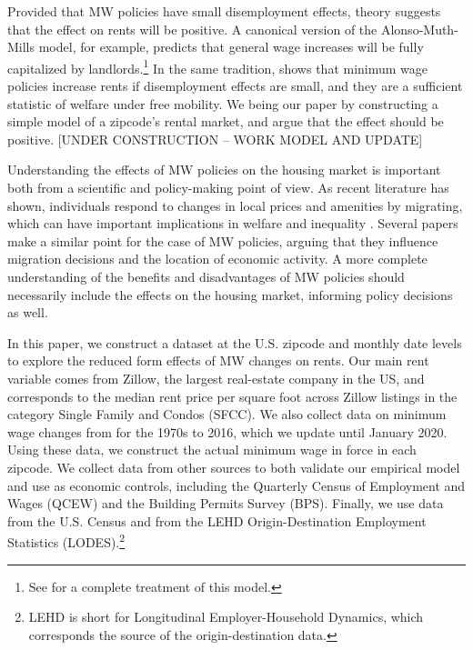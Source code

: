 Provided that MW policies have small disemployment effects, theory suggests that the effect 
on rents will be positive. A canonical version of the Alonso-Muth-Mills model, for example, 
predicts that general wage increases will be fully capitalized by landlords.\footnote{See 
	\textcite{Brueckner1987} for a complete treatment of this model.} 
In the same tradition, \textcite{Yamagishi2020} shows that minimum wage policies increase 
rents if disemployment effects are small, and they are a sufficient statistic of welfare 
under free mobility. We being our paper by constructing a simple model of a zipcode's rental 
market, and argue that the effect should be positive. [UNDER CONSTRUCTION -- WORK MODEL AND 
UPDATE]
 
Understanding the effects of MW policies on the housing market is important both from a 
scientific and policy-making point of view. As recent literature has shown, individuals 
respond to changes in local prices and amenities by migrating, which can have important 
implications in welfare and inequality \parencite{Diamond2016, Couture2019}. Several papers 
make a similar point for the case of MW policies, arguing that they influence migration 
decisions and the location of economic activity\parencite{PerezPerez2018, Monras2019}. A more 
complete understanding of the benefits and disadvantages of MW policies should necessarily 
include the effects on the housing market, informing policy decisions as well.
 
In this paper, we construct a dataset at the U.S. zipcode and monthly date levels to explore the reduced form effects of MW changes on rents. Our main rent variable comes from Zillow, the largest real-estate company in the US, and corresponds to the median rent price per square foot across Zillow listings in the category Single Family and Condos (SFCC). We also collect data on minimum wage changes from \textcite{VaghulZipperer2016} for the 1970s to 2016, which we update until January 2020. Using these data, we construct the actual minimum wage in force in each zipcode. We collect data from other sources to both validate our empirical model and use as economic controls, including the Quarterly Census of Employment and Wages (QCEW) and the Building Permits Survey (BPS). Finally, we use data from the U.S. Census and from the  LEHD Origin-Destination Employment Statistics (LODES).\footnote{LEHD is short for Longitudinal Employer-Household Dynamics, which corresponds the source of the origin-destination data.}

